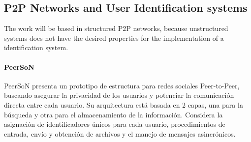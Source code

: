 %
%
%
%
%
%



\subsection{P2P Networks and User Identification systems}

The work will be based in structured P2P networks, because unstructured
systems does not have the desired properties for the implementation of a
identification system. 


\paragraph{PeerSoN}
PeerSoN presenta un prototipo de estructura para redes sociales
Peer-to-Peer, buscando asegurar la privacidad de los usuarios y potenciar la
comunicación directa entre cada usuario.
Su arquitectura está basada en 2 capas, una para la búsqueda y otra para el almacenamiento de la
información. Considera la asignación de identificadores únicos para cada
usuario, procedimientos de entrada, envío y obtención de archivos y el manejo
de mensajes asincrónicos.

